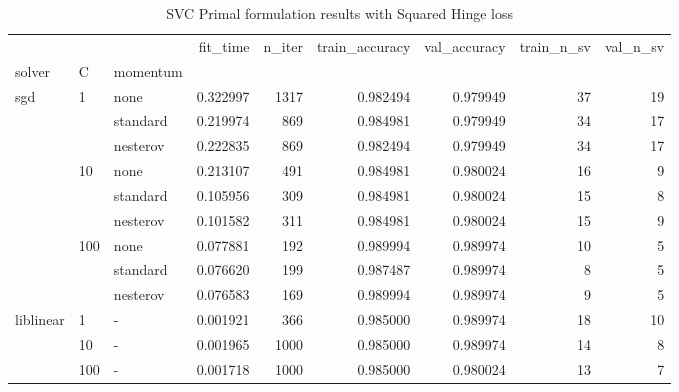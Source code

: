 \begin{table}[H]
\centering
\caption{SVC Primal formulation results with Squared Hinge loss}
\label{primal_svc_squared_hinge_cv_results}
\begin{tabular}{lllrrrrrr}
\toprule
          &     &   &  fit\_time &  n\_iter &  train\_accuracy &  val\_accuracy &  train\_n\_sv &  val\_n\_sv \\
solver & C & momentum &           &         &                 &               &             &           \\
\midrule
sgd & 1   & none &  0.322997 &    1317 &        0.982494 &      0.979949 &          37 &        19 \\
          &     & standard &  0.219974 &     869 &        0.984981 &      0.979949 &          34 &        17 \\
          &     & nesterov &  0.222835 &     869 &        0.982494 &      0.979949 &          34 &        17 \\
          & 10  & none &  0.213107 &     491 &        0.984981 &      0.980024 &          16 &         9 \\
          &     & standard &  0.105956 &     309 &        0.984981 &      0.980024 &          15 &         8 \\
          &     & nesterov &  0.101582 &     311 &        0.984981 &      0.980024 &          15 &         9 \\
          & 100 & none &  0.077881 &     192 &        0.989994 &      0.989974 &          10 &         5 \\
          &     & standard &  0.076620 &     199 &        0.987487 &      0.989974 &           8 &         5 \\
          &     & nesterov &  0.076583 &     169 &        0.989994 &      0.989974 &           9 &         5 \\
liblinear & 1   & - &  0.001921 &     366 &        0.985000 &      0.989974 &          18 &        10 \\
          & 10  & - &  0.001965 &    1000 &        0.985000 &      0.989974 &          14 &         8 \\
          & 100 & - &  0.001718 &    1000 &        0.985000 &      0.980024 &          13 &         7 \\
\bottomrule
\end{tabular}
\end{table}
